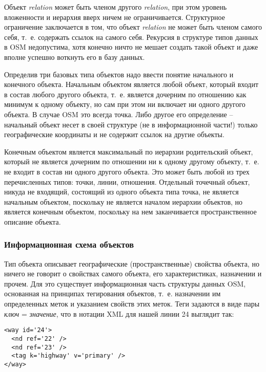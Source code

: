 Объект \emph{relation} может быть членом другого \emph{relation}, при этом 
уровень вложенности и иерархия вверх ничем не ограничивается. Структурное 
ограничение заключается в том, что объект \emph{relation} не может быть членом 
самого себя, т.~е. содержать ссылок на самого себя. Рекурсия в структуре типов 
данных в OSM недопустима, хотя конечно ничто не мешает создать такой объект 
и даже вполне успешно воткнуть его в базу данных.

Определив три базовых типа объектов надо ввести понятие начального и конечного 
объекта. Начальным объектом является любой объект, который входит в состав 
любого другого объекта, т.~е. является дочерним по отношению как минимум к 
одному объекту, но сам при этом ни включает ни одного другого объекта. В 
случае OSM это всегда точка. Либо другое его определение -- начальный объект 
несет в своей структуре (не в информационной части!) только географические 
координаты и не содержит ссылок на другие объекты.

Конечным объектом является максимальный по иерархии родительский объект, 
который не является дочерним по отношении ни к одному другому объекту, т.~е. не 
входит в состав ни одного другого объекта. Это может быть любой из трех 
перечисленных типов: точки, линии, отношения. Отдельный точечный объект, 
никуда не входящий, состоящий из одного объекта типа точка, не является 
начальным объектом, поскольку не является началом иерархии объектов, но 
является конечным объектом, поскольку на нем заканчивается пространственное 
описание объекта.\cite{habrahabr02}

\subsubsection{Информационная схема объектов}
Тип объекта описывает географические (пространственные) свойства объекта, но 
ничего не говорит о свойствах самого объекта, его характеристиках, назначении 
и прочем. Для это существует информационная часть структуры данных OSM, 
основанная на принципах тегирования объектов, т.~е. назначении им определенных 
меток и указанием свойств этих меток. Теги задаются в виде пары 
\emph{ключ} = \emph{значение}, что в нотации XML для нашей линии 24 выглядит 
так:

\small
\begin{verbatim}
<way id='24'>
  <nd ref='22' />
  <nd ref='23' />
  <tag k='highway' v='primary' />
</way>
\end{verbatim}
\normalsize

